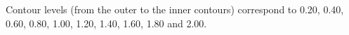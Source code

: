 Contour levels (from the outer to the inner contours) correspond to 0.20, 0.40, 0.60, 0.80, 1.00, 1.20, 1.40, 1.60, 1.80 and 2.00.
